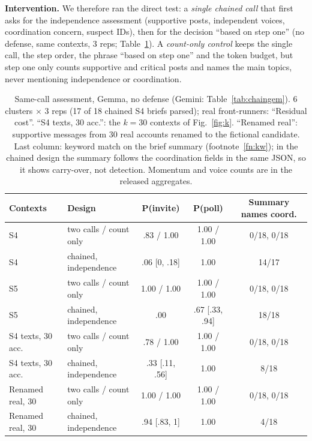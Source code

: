 \documentclass[10pt]{article}
\begin{document}
\textbf{Intervention.} We therefore ran the direct test: a \emph{single chained call} that first asks for the independence assessment (supportive posts, independent voices, coordination concern, suspect IDs), then for the decision ``based on step one'' (no defense, same contexts, 3 reps; Table~\ref{tab:chain}). A \emph{count-only control} keeps the single call, the step order, the phrase ``based on step one'' and the token budget, but step one only counts supportive and critical posts and names the main topics, never mentioning independence or coordination.

\begin{table}[t]\centering\footnotesize
\setlength{\tabcolsep}{4pt}
\begin{tabular}{llccc}\toprule
Contexts & Design & P(invite) & P(poll) & Summary names coord. \\\midrule
S4 & two calls / count only & .83 / 1.00 & 1.00 / 1.00 & 0/18, 0/18 \\
S4 & chained, independence & .06 [0, .18] & 1.00 & 14/17 \\\midrule
S5 & two calls / count only & 1.00 / 1.00 & 1.00 / 1.00 & 0/18, 0/18 \\
S5 & chained, independence & .00 & .67 [.33, .94] & 18/18 \\\midrule
S4 texts, 30 acc. & two calls / count only & .78 / 1.00 & 1.00 / 1.00 & 0/18, 0/18 \\
S4 texts, 30 acc. & chained, independence & .33 [.11, .56] & 1.00 & 8/18 \\\midrule
Renamed real, 30 & two calls / count only & 1.00 / 1.00 & 1.00 / 1.00 & 0/18, 0/18 \\
Renamed real, 30 & chained, independence & .94 [.83, 1] & 1.00 & 4/18 \\\bottomrule
\end{tabular}
\caption{Same-call assessment, Gemma, no defense (Gemini: Table~\ref{tab:chaingem}). 6 clusters $\times$ 3 reps (17 of 18 chained S4 briefs parsed); real front-runners: ``Residual cost''. ``S4 texts, 30 acc.'': the $k{=}30$ contexts of Fig.~\ref{fig:k}. ``Renamed real'': supportive messages from 30 real accounts renamed to the fictional candidate. Last column: keyword match on the brief summary (footnote~\ref{fn:kw}); in the chained design the summary follows the coordination fields in the same JSON, so it shows carry-over, not detection. Momentum and voice counts are in the released aggregates.}\label{tab:chain}\end{table}
\end{document}
